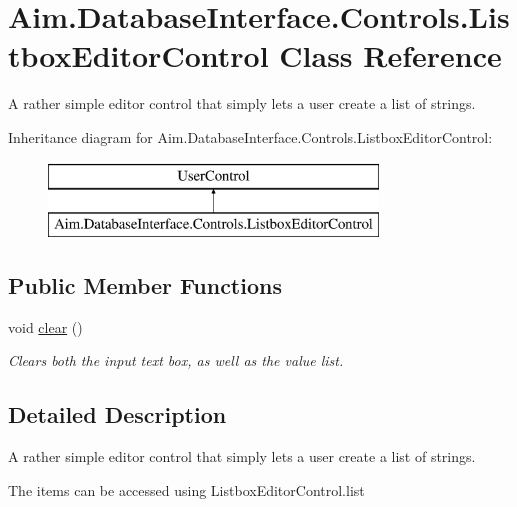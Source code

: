\hypertarget{class_aim_1_1_database_interface_1_1_controls_1_1_listbox_editor_control}{}\section{Aim.\+Database\+Interface.\+Controls.\+Listbox\+Editor\+Control Class Reference}
\label{class_aim_1_1_database_interface_1_1_controls_1_1_listbox_editor_control}


A rather simple editor control that simply lets a user create a list of strings.  


Inheritance diagram for Aim.\+Database\+Interface.\+Controls.\+Listbox\+Editor\+Control\+:\begin{figure}[H]
\begin{center}
\leavevmode
\includegraphics[height=2.000000cm]{class_aim_1_1_database_interface_1_1_controls_1_1_listbox_editor_control}
\end{center}
\end{figure}
\subsection*{Public Member Functions}
\begin{DoxyCompactItemize}
\item 
void \mbox{\hyperlink{class_aim_1_1_database_interface_1_1_controls_1_1_listbox_editor_control_a2ba9d7b1099ff6393681e812dab6edd3}{clear}} ()
\begin{DoxyCompactList}\small\item\em Clears both the input text box, as well as the value list. \end{DoxyCompactList}\end{DoxyCompactItemize}


\subsection{Detailed Description}
A rather simple editor control that simply lets a user create a list of strings. 

The items can be accessed using Listbox\+Editor\+Control.\+list 

